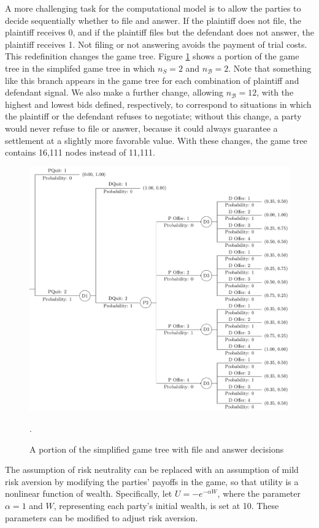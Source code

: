 \documentclass{article}
\begin{document}
A more challenging task for the computational model is to allow the parties to decide sequentially whether to file and answer. If the plaintiff does not file, the plaintiff receives 0, and if the plaintiff files but the defendant does not answer, the plaintiff receives 1. Not filing or not answering avoids the payment of trial costs. This redefinition changes the game tree. Figure \ref{fig:quittree} shows a portion of the game tree in the simplifed game tree in which $n_S=2$ and $n_{\mathcal{B}}=2$. Note that something like this branch appears in the game tree for each combination of plaintiff and defendant signal. We also make a further change, allowing $n_{\mathcal{B}}=12$, with the highest and lowest bids defined, respectively, to correspond to situations in which the plaintiff or the defendant refuses to negotiate; without this change, a party would never refuse to file or answer, because it could always guarantee a settlement at a slightly more favorable value. With these changes, the game tree contains 16,111 nodes instead of 11,111.

\begin{figure}[h!]
\centering
\includegraphics[scale=0.50, trim={0in 0in 0in 0in}, clip]{../Figures/quittree.pdf}
\caption{A portion of the simplified game tree with file and answer decisions}.
\label{fig:quittree}
\end{figure}

The assumption of risk neutrality can be replaced with an assumption of mild risk aversion by modifying the parties' payoffs in the game, so that utility is a nonlinear function of wealth. Specifically, let $U = -e^{-\alpha W}$, where the parameter $\alpha=1$ and $W$, representing each party's initial wealth, is set at 10. These parameters can be modified to adjust risk aversion.
\end{document}
